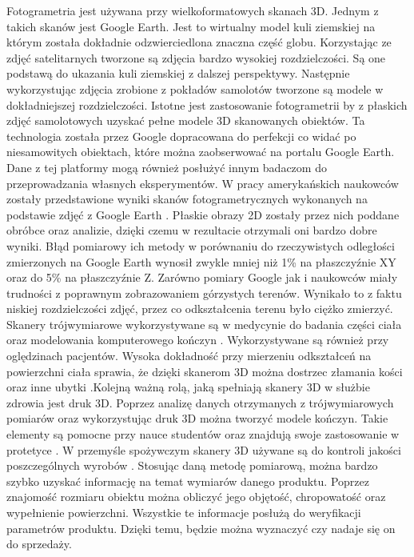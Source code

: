 Fotogrametria jest używana przy wielkoformatowych skanach 3D. Jednym z takich skanów jest Google Earth. Jest to wirtualny model kuli ziemskiej na którym została dokładnie odzwierciedlona znaczna część globu. Korzystając ze zdjęć satelitarnych tworzone są zdjęcia bardzo wysokiej rozdzielczości. Są one podstawą do ukazania kuli ziemskiej z dalszej perspektywy. Następnie wykorzystując zdjęcia zrobione z pokładów samolotów tworzone są modele w dokładniejszej rozdzielczości. Istotne jest zastosowanie fotogrametrii by z płaskich zdjęć samolotowych uzyskać pełne modele 3D skanowanych obiektów. Ta technologia została przez Google dopracowana do perfekcji co widać po niesamowitych obiektach, które można zaobserwować na portalu Google Earth. Dane z tej platformy mogą również posłużyć innym badaczom do przeprowadzania własnych eksperymentów. W pracy amerykańskich naukowców zostały przedstawione wyniki skanów fotogrametrycznych wykonanych na podstawie zdjęć z Google Earth \cite{inproceedings}. Płaskie obrazy 2D zostały przez nich poddane obróbce oraz analizie, dzięki czemu w rezultacie otrzymali oni bardzo dobre wyniki. Błąd pomiarowy ich metody w porównaniu do rzeczywistych odległości zmierzonych na Google Earth wynosił zwykle mniej niż 1\% na płaszczyźnie XY oraz do 5\% na płaszczyźnie Z. Zarówno pomiary Google jak i naukowców miały trudności z poprawnym zobrazowaniem górzystych terenów. Wynikało to z faktu niskiej rozdzielczości zdjęć, przez co odkształcenia terenu było ciężko zmierzyć. 
\newline \indent Skanery trójwymiarowe wykorzystywane są w medycynie do badania części ciała oraz modelowania komputerowego kończyn \cite{tomaka20053d}. Wykorzystywane są również przy oględzinach pacjentów. Wysoka dokładność przy mierzeniu odkształceń na powierzchni ciała sprawia, że dzięki skanerom 3D można dostrzec złamania kości oraz inne ubytki \cite{thali2003optical}.Kolejną ważną rolą, jaką spełniają skanery 3D w służbie zdrowia jest druk 3D. Poprzez analizę danych otrzymanych z trójwymiarowych pomiarów oraz wykorzystując druk 3D można tworzyć modele kończyn. Takie elementy są pomocne przy nauce studentów oraz znajdują swoje zastosowanie w protetyce \cite{mcmenamin2014production}. 
\newline \indent W przemyśle spożywczym skanery 3D używane są do kontroli jakości poszczególnych wyrobów \cite{anders2012zastosowanie}. Stosując daną metodę pomiarową, można bardzo szybko uzyskać informację na temat wymiarów danego produktu. Poprzez znajomość rozmiaru obiektu można obliczyć jego objętość, chropowatość oraz wypełnienie powierzchni. Wszystkie te informacje posłużą do weryfikacji parametrów produktu. Dzięki temu, będzie można wyznaczyć czy nadaje się on do sprzedaży.
